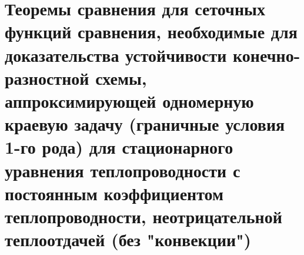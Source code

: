 \documentclass[__main__.tex]{subfiles}
\begin{document}
\section{Теоремы сравнения для сеточных функций сравнения, необходимые для доказательства устойчивости конечно-разностной схемы, аппроксимирующей одномерную краевую задачу (граничные условия 1-го рода) для стационарного уравнения теплопроводности с постоянным коэффициентом теплопроводности, неотрицательной теплоотдачей (без "конвекции")}
\end{document}

